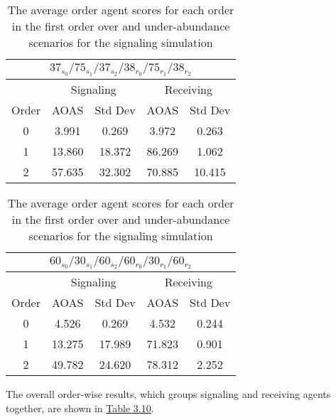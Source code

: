 \begin{table}[h]
    \centering
    \begin{tabular}{|c|c|c|c|c|}
    \hline
    \multicolumn{5}{|c|}{$37_{s_{0}}/75_{s_{1}}/37_{s_{2}}/38_{r_{0}}/75_{r_{1}}/38_{r_{2}}$} \\
    \hline
    \multicolumn{1}{|c|}{} & \multicolumn{2}{|c|}{Signaling} & \multicolumn{2}{|c|}{Receiving} \\
    \hline
    Order & AOAS & Std Dev & AOAS & Std Dev \\
    \hline
    0     & 3.991   & 0.269    & 3.972   & 0.263   \\
    1     & 13.860  & 18.372   & 86.269  & 1.062   \\
    2     & 57.635  & 32.302   & 70.885  & 10.415   \\
    \hline
    \end{tabular}
    \qquad
    \begin{tabular}{|c|c|c|c|c|}
        \hline
        \multicolumn{5}{|c|}{$60_{s_{0}}/30_{s_{1}}/60_{s_{2}}/60_{r_{0}}/30_{r_{1}}/60_{r_{2}}$} \\
        \hline
        \multicolumn{1}{|c|}{} & \multicolumn{2}{|c|}{Signaling} & \multicolumn{2}{|c|}{Receiving} \\
        \hline
        Order & AOAS & Std Dev & AOAS & Std Dev \\
        \hline
        0     & 4.526   & 0.269    & 4.532   & 0.244   \\
        1     & 13.275  & 17.989   & 71.823  & 0.901   \\
        2     & 49.782  & 24.620   & 78.312  & 2.252   \\
        \hline
    \end{tabular}
    \caption{The average order agent scores for each order in the first order over and under-abundance scenarios for the signaling simulation}
    \label{table:sig-first-order-simple}
\end{table}

The overall order-wise results, which groups signaling and receiving agents together, are shown in \hyperref[table:sig-first-order-overall]{Table 3.10}.

